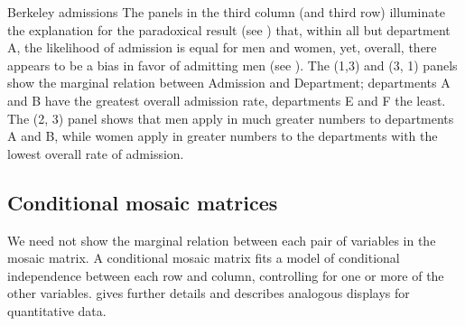 \begin{Example}[berkeley4]{Berkeley admissions}
The panels in the third column (and third row)
illuminate the explanation for the paradoxical
result (see ) that, within all but department A,
the likelihood of admission is equal for men and women,
yet, overall, there appears to be a bias in favor of admitting men
(see ).
The (1,3) and (3, 1) panels show
the marginal relation between Admission and Department; departments A and B have the greatest
overall admission rate, departments E and F the least.
The (2, 3) panel shows that men apply in much greater numbers to
departments A and B, while women apply in greater numbers to
the departments with the lowest overall rate of admission.
\end{Example}

\subsection{Conditional mosaic matrices}\label{sec:condmat}

We need not show the marginal relation between
each pair of variables in the mosaic matrix.
A conditional mosaic matrix fits a model of conditional independence
between each row and column, controlling for one or more of the other
variables.   \citet{Friendly:99b} gives further details and describes
analogous displays for quantitative data.

